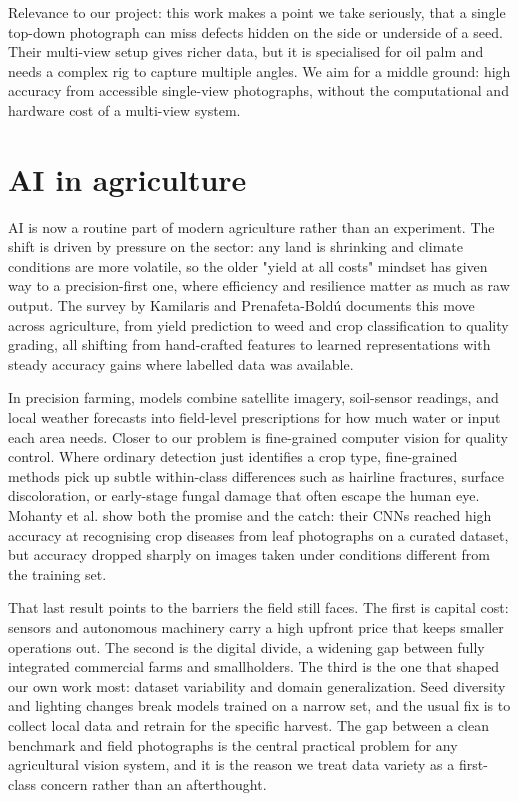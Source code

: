 Relevance to our project: this work makes a point we take seriously, that a
single top-down photograph can miss defects hidden on the side or underside of a
seed. Their multi-view setup gives richer data, but it is specialised for oil
palm and needs a complex rig to capture multiple angles. We aim for a middle
ground: high accuracy from accessible single-view photographs, without the
computational and hardware cost of a multi-view system.


\section{AI in agriculture}

AI is now a routine part of modern agriculture rather than an experiment. The
shift is driven by pressure on the sector: any land is shrinking and climate
conditions are more volatile, so the older "yield at all costs" mindset has given
way to a precision-first one, where efficiency and resilience matter as much as
raw output. The survey by Kamilaris and Prenafeta-Bold\'u
\cite{kamilaris2018deepag} documents this move across agriculture, from yield
prediction to weed and crop classification to quality grading, all shifting from
hand-crafted features to learned representations with steady accuracy gains where
labelled data was available.

In precision farming, models combine satellite imagery, soil-sensor readings,
and local weather forecasts into field-level prescriptions for how much water or
input each area needs. Closer to our problem is fine-grained computer vision for
quality control. Where ordinary detection just identifies a crop type,
fine-grained methods pick up subtle within-class differences such as hairline
fractures, surface discoloration, or early-stage fungal damage that often escape
the human eye. Mohanty et al. \cite{mohanty2016plant} show both the promise and
the catch: their CNNs reached high accuracy at recognising crop diseases from
leaf photographs on a curated dataset, but accuracy dropped sharply on images
taken under conditions different from the training set.

That last result points to the barriers the field still faces. The first is
capital cost: sensors and autonomous machinery carry a high upfront price that
keeps smaller operations out. The second is the digital divide, a widening gap
between fully integrated commercial farms and smallholders. The third is the one
that shaped our own work most: dataset variability and domain generalization.
Seed diversity and lighting changes break models trained on a narrow set, and
the usual fix is to collect local data and retrain for the specific harvest. The
gap between a clean benchmark and field photographs is the central practical
problem for any agricultural vision system, and it is the reason we treat data
variety as a first-class concern rather than an afterthought.


